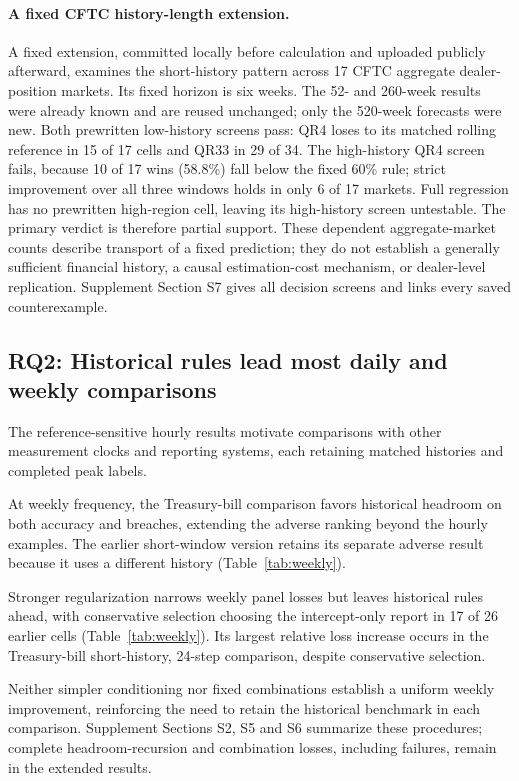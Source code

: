 \documentclass[12pt,a4paper]{article}
\begin{document}
\paragraph{A fixed CFTC history-length extension.}\label{par:wp2-history}
A fixed extension, committed locally before calculation and uploaded publicly afterward, examines the short-history pattern across 17 CFTC aggregate dealer-position markets. Its fixed horizon is six weeks. The 52- and 260-week results were already known and are reused unchanged; only the 520-week forecasts were new. Both prewritten low-history screens pass: QR4 loses to its matched rolling reference in 15 of 17 cells and QR33 in 29 of 34. The high-history QR4 screen fails, because 10 of 17 wins (58.8\%) fall below the fixed 60\% rule; strict improvement over all three windows holds in only 6 of 17 markets. Full regression has no prewritten high-region cell, leaving its high-history screen untestable. The primary verdict is therefore partial support. These dependent aggregate-market counts describe transport of a fixed prediction; they do not establish a generally sufficient financial history, a causal estimation-cost mechanism, or dealer-level replication. Supplement Section S7 gives all decision screens and links every saved counterexample.

\subsection{RQ2: Historical rules lead most daily and weekly comparisons}

The reference-sensitive hourly results motivate comparisons with other measurement clocks and reporting systems, each retaining matched histories and completed peak labels.

At weekly frequency, the Treasury-bill comparison favors historical headroom on both accuracy and breaches, extending the adverse ranking beyond the hourly examples. The earlier short-window version retains its separate adverse result because it uses a different history (Table~\ref{tab:weekly}).

Stronger regularization narrows weekly panel losses but leaves historical rules ahead, with conservative selection choosing the intercept-only report in 17 of 26 earlier cells (Table~\ref{tab:weekly}). Its largest relative loss increase occurs in the Treasury-bill short-history, 24-step comparison, despite conservative selection.

Neither simpler conditioning nor fixed combinations establish a uniform weekly improvement, reinforcing the need to retain the historical benchmark in each comparison. Supplement Sections S2, S5 and S6 summarize these procedures; complete headroom-recursion and combination losses, including failures, remain in the extended results.
\end{document}
